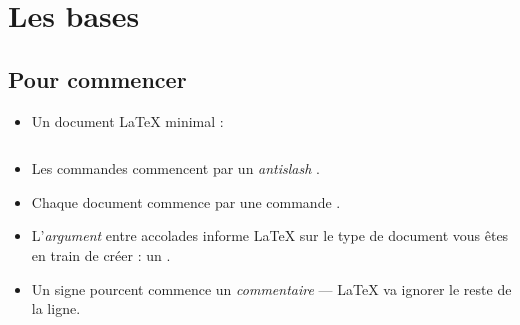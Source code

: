 \documentclass{beamer}
\begin{document}
\section{Les bases}

\subsection{Pour commencer}
\begin{frame}[fragile]{\insertsubsection}
\begin{itemize}
\item Un document \LaTeX{} minimal :
\inputminted[frame=single]{latex}{basics.tex}
\item Les commandes commencent par un \emph{antislash} \keystrokebftt{\bs}.
\item Chaque document commence par une commande .
\item L'\emph{argument} entre accolades \keystrokebftt{\{} \keystrokebftt{\}} informe \LaTeX{} sur le type de document vous êtes en train de créer : un .
\item Un signe pourcent \keystrokebftt{\%} commence un \emph{commentaire} --- \LaTeX{}
va ignorer le reste de la ligne.
\end{itemize}
\end{frame}
\end{document}
